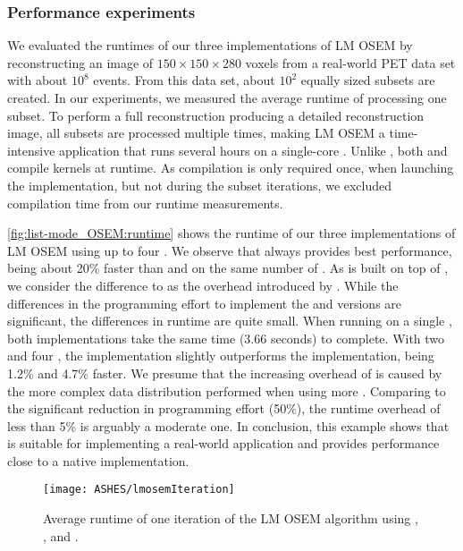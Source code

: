 \subsubsection*{Performance experiments}
We evaluated the runtimes of our three implementations of LM OSEM by reconstructing an image of $150\times 150\times 280$ voxels from a real-world PET data set with about $10^8$ events.
From this data set, about $10^2$ equally sized subsets are created.
In our experiments, we measured the average runtime of processing one subset.
To perform a full reconstruction producing a detailed reconstruction image, all subsets are processed multiple times, making LM OSEM a time-intensive application that runs several hours on a single-core \CPU.
Unlike \CUDA, both \OpenCL and \SkelCL compile kernels at runtime.
As compilation is only required once, when launching the implementation, but not during the subset iterations, we excluded compilation time from our runtime measurements.

\autoref{fig:list-mode_OSEM:runtime} shows the runtime of our three implementations of LM OSEM using up to four \GPUs.
We observe that \CUDA always provides best performance, being about 20\% faster than \OpenCL and \SkelCL on the same number of \GPUs.
As \SkelCL is built on top of \OpenCL, we consider the difference to \OpenCL as the overhead introduced by \SkelCL.
While the differences in the programming effort to implement the \SkelCL and \OpenCL versions are significant, the differences in runtime are quite small.
When running on a single \GPU, both implementations take the same time (3.66 seconds) to complete.
With two and four \GPUs, the \OpenCL implementation slightly outperforms the \SkelCL implementation, being 1.2\% and 4.7\% faster.
We presume that the increasing overhead of \SkelCL is caused by the more complex data distribution performed when using more \GPUs.
Comparing to the significant reduction in programming effort (50\%), the runtime overhead of less than 5\% is arguably a moderate one.
In conclusion, this example shows that \SkelCL is suitable for implementing a real-world application and provides performance close to a native \OpenCL implementation.

\begin{figure}
  \centering
  \texttt{[image: ASHES/lmosemIteration]}
  \caption{Average runtime of one iteration of the LM OSEM algorithm using \SkelCL, \OpenCL, and \CUDA.}
  \label{fig:list-mode_OSEM:runtime}
\end{figure}


